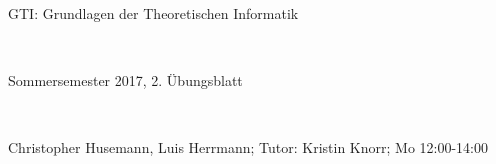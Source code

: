 \documentclass{article}
\begin{document}
	
	\hrulefill
	\begin{center}
		\bfseries %
		\sffamily %
		\begin{huge}
			GTI: Grundlagen der Theoretischen Informatik
		\end{huge}\\
		\begin{Large}
			Sommersemester 2017, 2. Übungsblatt
		\end{Large}\\
		\begin{small}
			Christopher Husemann, Luis Herrmann; Tutor: Kristin Knorr; Mo 12:00-14:00
		\end{small}
		
		\vspace{-10pt}
	\end{center}
	\hrulefill
	
\end{document}
